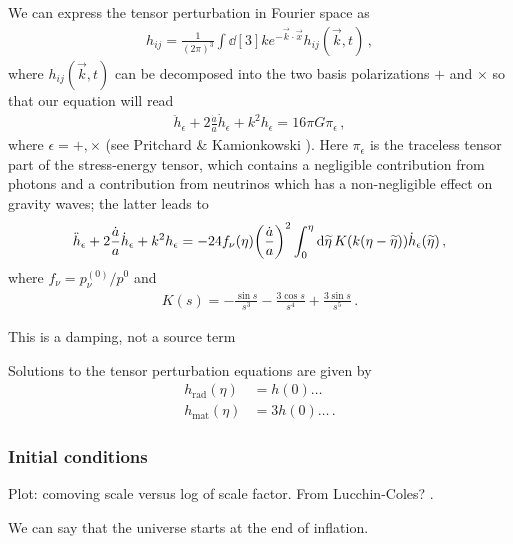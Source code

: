 \documentclass[main.tex]{subfiles}
\begin{document}
We can express the tensor perturbation in Fourier space as 
%
\begin{align}
h_{ij} = \frac{1}{(2\pi )^3} \int \dd[3]{k} e^{- \vec{k} \cdot \vec{x}}
h_{ij} (\vec{k}, t)
\,,
\end{align}
%
where \(h_{ij} (\vec{k}, t)\) can be decomposed into the two basis polarizations \(+\) and \(\times \)
so that our equation will read 
%
\begin{align}
\ddot{h}_{\epsilon } + 2 \frac{\dot{a}}{a} \dot{h}_{\epsilon } + k^2 h_{\epsilon } = 16 \pi G \pi_{\epsilon }
\,,
\end{align}
%
where \(\epsilon = +, \times \) (see Pritchard \& Kamionkowski \cite[]{pritchardCosmicMicrowaveBackground2005}). 
Here \(\pi_{\epsilon } \) is the traceless tensor part of the stress-energy tensor, which contains a negligible contribution from photons and a contribution from neutrinos which has a non-negligible effect on gravity waves; the latter leads to 
%
\begin{align}
\ddot{h}_{\epsilon } + 2 \frac{\dot{a}}{a} \dot{h}_{\epsilon }
+ k^2 h_{\epsilon } =
-24 f_{\nu }(\eta ) \qty(\frac{\dot{a}}{a})^2
\int_{0}^{\eta } \dd{\widetilde{\eta} } K (k (\eta - \widetilde{\eta})) \dot{h}_{\epsilon }(\widetilde{\eta})
\,,
\end{align}
%
where \(f_{\nu } = p_{\nu }^{(0)} / p^{0}\) and 
%
\begin{align}
K(s) = - \frac{\sin s}{s^3} - \frac{3 \cos s}{s^{4}}
+ \frac{3 \sin s}{s^{5}}
\,.
\end{align}

This is a damping, not a source term


Solutions to the tensor perturbation equations are given by 
%
\begin{align}
h _{\text{rad}} (\eta ) &= h(0) \dots  \\
h _{\text{mat}} (\eta ) &= 3 h(0) \dots
\,.
\end{align}

\subsubsection{Initial conditions}

Plot: comoving scale versus log of scale factor. From Lucchin-Coles? \cite[]{colespCosmology2002}. 

We can say that the universe starts at the end of inflation.
\end{document}
